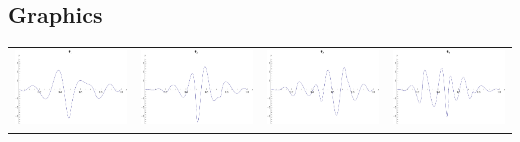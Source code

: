 \documentclass{article}
\begin{document}
\begin{landscape}
\subsection{Graphics}
\begin{tabular}{cccc}
\includegraphics[width=5.0cm]{septic_wavelet_1.pdf}& \includegraphics[width=5.0cm]{septic_wavelet_2.pdf}& \includegraphics[width=5.0cm]{septic_wavelet_3.pdf}& \includegraphics[width=5.0cm]{septic_wavelet_4.pdf} \\

\end{tabular}
\end{landscape}
\end{document}
